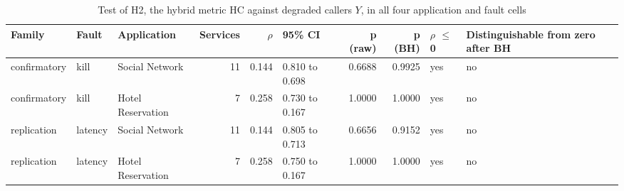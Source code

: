 \begin{table}[!t]
\centering
\caption{Test of H2, the hybrid metric HC against degraded callers $Y$, in all four application and fault cells}
\label{tab:tbl_ieee_h2}
\footnotesize
\setlength{\tabcolsep}{3pt}

\begin{tabular}{lllrrlrrlp{2.6cm}}
\toprule
\textbf{Family} & \textbf{Fault} & \textbf{Application} & \textbf{Services} & \textbf{$\rho$} & \textbf{95\% CI} & \textbf{p (raw)} & \textbf{p (BH)} & \textbf{$\rho$ $\leq$ 0} & \textbf{Distinguishable from zero after BH} \\
\midrule
confirmatory & kill & Social Network & 11 & \textminus{}0.144 & \textminus{}0.810 to 0.698 & 0.6688 & 0.9925 & yes & no \\
confirmatory & kill & Hotel Reservation & 7 & \textminus{}0.258 & \textminus{}0.730 to \textminus{}0.167 & 1.0000 & 1.0000 & yes & no \\
replication & latency & Social Network & 11 & \textminus{}0.144 & \textminus{}0.805 to 0.713 & 0.6656 & 0.9152 & yes & no \\
replication & latency & Hotel Reservation & 7 & \textminus{}0.258 & \textminus{}0.750 to \textminus{}0.167 & 1.0000 & 1.0000 & yes & no \\
\bottomrule
\end{tabular}
\end{table}
